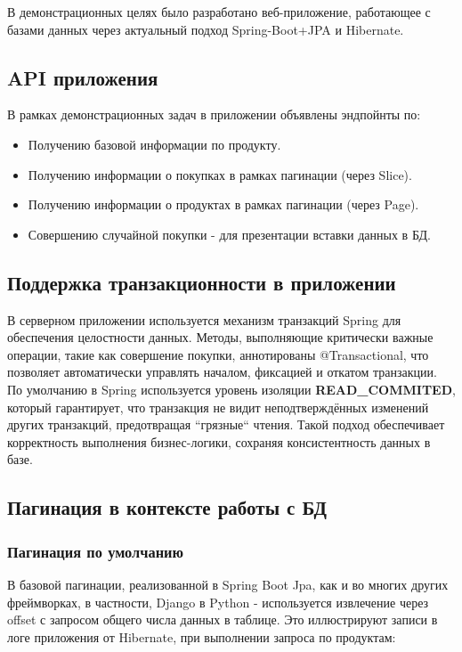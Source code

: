 В демонстрационных целях было разработано веб-приложение, работающее с базами данных через актуальный подход
Spring-Boot+JPA и Hibernate.

\subsection{API приложения}\label{subsec:api-server-app}
В рамках демонстрационных задач в приложении объявлены эндпойнты по:
\begin{itemize}
    \item Получению базовой информации по продукту.
    \item Получению информации о покупках в рамках пагинации (через Slice).
    \item Получению информации о продуктах в рамках пагинации (через Page).
    \item Совершению случайной покупки - для презентации вставки данных в БД.
\end{itemize}

\subsection{Поддержка транзакционности в приложении}\label{subsec:apptransaction}
В серверном приложении используется механизм транзакций Spring для обеспечения целостности данных.
Методы, выполняющие критически важные операции, такие как совершение покупки, аннотированы @Transactional,
что позволяет автоматически управлять началом, фиксацией и откатом транзакции.
По умолчанию в Spring используется уровень изоляции \textbf{READ\_COMMITED},
который гарантирует, что транзакция не видит неподтверждённых изменений других транзакций,
предотвращая ``грязные`` чтения.
Такой подход обеспечивает корректность выполнения бизнес-логики, сохраняя консистентность данных в базе.


\subsection{Пагинация в контексте работы с БД}\label{subsec:jpapagination}

\subsubsection{Пагинация по умолчанию}\label{subsubsec:defaultpagination}
В базовой пагинации, реализованной в Spring Boot Jpa, как и во многих других фреймворках,
в частности, Django в Python - используется извлечение через offset с запросом общего числа данных в таблице.
Это иллюстрируют записи в логе приложения от Hibernate, при выполнении запроса по продуктам:

